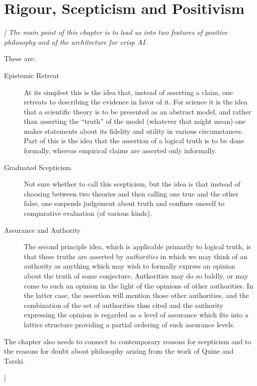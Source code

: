
\chapter{Rigour, Scepticism and Positivism}\label{RigourSkepticismAndPositivism}

{\it[
The main point of this chapter is to lead us into two features of
positive philosophy and of the architecture for crisp AI.

These are:
\begin{description}
\item[Epistemic Retreat]
At its simplest this is the idea that, instead of asserting a claim,
one retreats to describing the evidence in favor of it.
For science it is the idea that a scientific theory is to be presented
as an abstract model, and rather than asserting the ``truth'' of the
model (whatever that might mean) one makes statements about its
fidelity and utility in various circumstances.
Part of this is the idea that the assertion of a logical truth is to
be done formally, whereas empirical claims are asserted only
informally.
\item[Graduated Scepticism]
Not sure whether to call this scepticism, but the idea is that instead
of choosing between two theories and then calling one true and the
other false, one suspends judgement about truth and confines oneself
to comparative evaluation (of various kinds).
\item[Assurance and Authority]
The second principle idea, which is applicable primarily to logical
truth, is that these truths are asserted by \emph{authorities} in
which we may think of an authority as anything which may wish to
formally express an opinion about the truth of some conjecture.
Authorities may do so baldly, or may come to such an opinion in the
light of the opinions of other authorities.
In the latter case, the assertion will mention those other
authorities, and the combination of the set of authorities thus cited
and the authority expressing the opinion is regarded as a level of
assurance which fits into a lattice structure providing a partial
ordering of such assurance levels.
\end{description}

The chapter also needs to connect to contemporary reasons for
scepticism and to the reasons for doubt about philosophy arising from
the work of Quine and Tarski.

]}


